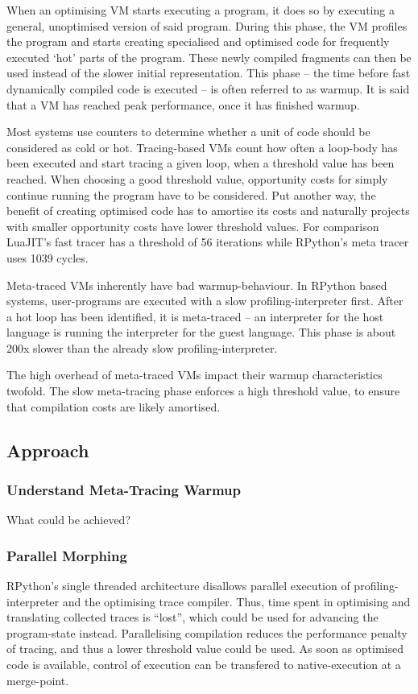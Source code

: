 When an optimising VM starts executing a program, it does so by executing a
general, unoptimised version of said program. During this phase, the VM profiles
the program and starts creating specialised and optimised code for frequently
executed `hot' parts of the program. These newly compiled fragments can then be
used instead of the slower initial representation. This phase -- the time before
fast dynamically compiled code is executed -- is often referred to as warmup.
It is said that a VM has reached peak performance, once it has finished warmup.

Most systems use counters to determine whether a unit of code should be
considered as cold or hot. Tracing-based VMs count how often a loop-body has
been executed and start tracing a given loop, when a threshold value has been
reached. When choosing a good threshold value, opportunity costs for simply
continue running the program have to be considered. Put another way, the benefit
of creating optimised code has to amortise its costs and naturally projects with
smaller opportunity costs have lower threshold values. For comparison LuaJIT's
fast tracer has a threshold of 56 iterations while RPython's meta tracer uses
1039 cycles.

Meta-traced VMs inherently have bad warmup-behaviour. In RPython based systems,
user-programs are executed with a slow profiling-interpreter first. After a hot
loop has been identified, it is meta-traced -- an interpreter for the host
language is running the interpreter for the guest language. This phase is about
200x slower than the already slow profiling-interpreter.

The high overhead of meta-traced VMs impact their warmup characteristics
twofold. The slow meta-tracing phase enforces a high threshold value, to ensure
that compilation costs are likely amortised.

\subsection{Approach}

\subsubsection{Understand Meta-Tracing Warmup}
What could be achieved?


\subsubsection{Parallel Morphing} RPython's single threaded architecture disallows
parallel execution of profiling-interpreter and the optimising trace compiler.
Thus, time spent in optimising and translating collected traces is ``lost'',
which could be used for advancing the program-state instead. Parallelising
compilation reduces the performance penalty of tracing, and thus a lower
threshold value could be used. As soon as optimised code is available, control
of execution can be transfered to native-execution at a merge-point.

